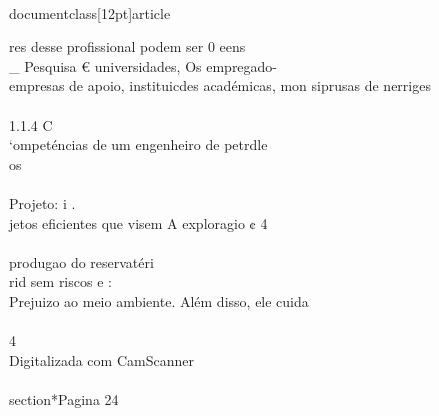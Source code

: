 \\documentclass[12pt]{article}
\begin{document}
{res desse profissional podem ser 0 eens \\_ Pesquisa € universidades, Os empregado-\\
empresas de apoio, instituicdes académicas, mon siprusas de nerriges\\
\\
1.1.4 C\\
‘ompeténcias de um engenheiro de petrdle\\
os\\
\\
Projeto: i .\\
jetos eficientes que visem A exploragio ¢ 4\\
\\
produgao do reservatéri\\
rid sem riscos e :\\
Prejuizo ao meio ambiente. Além disso, ele cuida\\
\\
4\\
Digitalizada com CamScanner\\

\\section*{Pagina 24}

}
\end{document}
